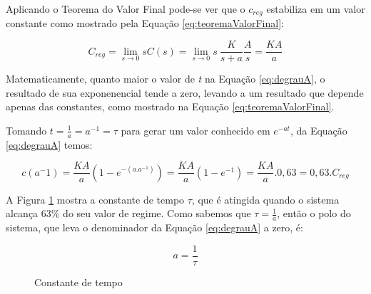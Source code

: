 Aplicando o Teorema do Valor Final pode-se ver que o \emph{$c_{reg}$} estabiliza em um valor constante como mostrado pela Equação \ref{eq:teoremaValorFinal}:

\begin{equation}
C_{reg} = \lim_{s \rightarrow 0} sC(s) = \lim_{s \rightarrow 0} s\ \frac{K}{s+a}\frac{A}{s} = \frac{KA}{a}
\label{eq:teoremaValorFinal}
\end{equation}

Matematicamente, quanto maior o valor de \emph{t} na Equação \ref{eq:degrauA}, o resultado de sua exponenencial tende a zero, levando a um resultado que depende apenas das constantes, como mostrado na Equação \ref{eq:teoremaValorFinal}. 

Tomando $t= \frac{1}{a} = a^{-1} = \tau$ para gerar um valor conhecido em $e^{-at}$, da Equação \ref{eq:degrauA} temos:


\begin{equation}
c(a^-1) = \frac{KA}{a}(1-e^{-(a.a^{-1})}) = \frac{KA}{a}(1-e^{-1}) = \frac{KA}{a}.0,63 = 0,63 . C_{reg}
\end{equation}

A Figura \ref{fig:constTempo} mostra a constante de tempo $\tau$, que é atingida quando o sistema alcança 63\% do seu valor de regime. Como sabemos que $\tau = \frac{1}{a}$, então o polo do sistema, que leva o denominador da Equação \ref{eq:degrauA} a zero, é:

\begin{equation}
a = \frac{1}{\tau}
\end{equation}



\begin{figure}
\centering
{}
\caption{Constante de tempo}
\label{fig:constTempo}
\end{figure}


